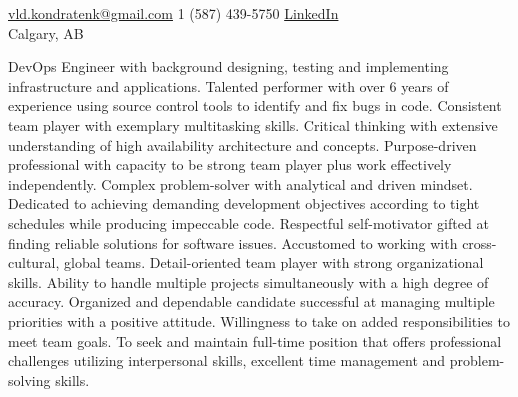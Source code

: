 \documentclass[10pt,a4paper]{article} %
\begin{document}
 



\noindent\href{mailto:vld.kondratenk@gmail.com}{vld.kondratenk@gmail.com}\bull %
\textsmaller{+}1 (587) 439-5750\bull  %
\href{https://www.linkedin.com/in/bakbukdibbuk/}{LinkedIn}\\ %
Calgary, AB

\spacedhrule{0.9em}{-0.4em} %



\vspace{-1.3em} %

\begin{multicols}{2}  %
DevOps Engineer with background designing, testing and implementing infrastructure and applications. Talented performer with over 6 years of experience using source control tools to identify and fix bugs in code. Consistent team player with exemplary multitasking skills. Critical thinking with extensive understanding of high availability architecture and concepts. Purpose-driven professional with capacity to be strong team player plus work effectively independently. Complex problem-solver with analytical and driven mindset. Dedicated to achieving demanding development objectives according to tight schedules while producing impeccable code. Respectful self-motivator gifted at finding reliable solutions for software issues. Accustomed to working with cross-cultural, global teams. Detail-oriented team player with strong organizational skills. Ability to handle multiple projects simultaneously with a high degree of accuracy. Organized and dependable candidate successful at managing multiple priorities with a positive attitude. Willingness to take on added responsibilities to meet team goals. To seek and maintain full-time position that offers professional challenges utilizing interpersonal skills, excellent time management and problem-solving skills.
\end{multicols}
\end{document}
